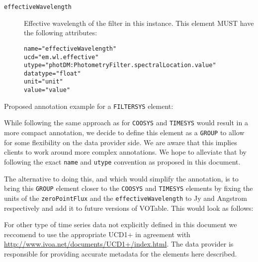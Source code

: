 \documentclass[11pt,a4paper]{ivoa}
\let\fg=\color
\def\attr#1{{\tt{\fg{DarkRed}#1}}}
\def\elem#1{{\tt{\fg{DarkRed}#1}}}
\def\attrval#1#2{{\tt{\fg{DarkRed}#1}="{\fg{DarkPurple}#2}"}}
\begin{document}
\begin{description}
\item[\elem{effectiveWavelength}] Effective wavelength of the filter in this instance. This element MUST have the following attributes:
\begin{description}
    \item[\attrval{name}{effectiveWavelength}]
    \item[\attrval{ucd}{em.wl.effective}]
    \item[\attrval{utype}{photDM:PhotometryFilter.spectralLocation.value}] 
    \item[\attrval{datatype}{float}]
    \item[\attrval{unit}{unit}]
    \item[\attrval{value}{value}]
\end{description}
\end{description}

Proposed annotation example for a \elem{FILTERSYS} element: 



While following the same approach as for \elem{COOSYS} and \elem{TIMESYS} would result in a more compact annotation, we decide to define this element as a \elem{GROUP} to allow for some flexibility on the data provider side. We are aware that this implies clients to work around more complex annotations. We hope to alleviate that by following the exact \attr{name} and \attr{utype} convention as proposed in this document.

The alternative to doing this, and which would simplify the annotation, is to bring this \elem{GROUP} element closer to the \elem{COOSYS} and \elem{TIMESYS} elements by fixing the units of the \attr{zeroPointFlux} and the \attr{effectiveWavelength} to Jy and Angstrom respectively and add it to future versions of VOTable. This would look as follows: 




%

For other type of time series data not explicitly defined in this document we reccomend to use the appropriate UCD1+ in agreement with \url{http://www.ivoa.net/documents/UCD1+/index.html}. The data provider is responsible for providing accurate metadata for the elements here described.


%
\end{document}
